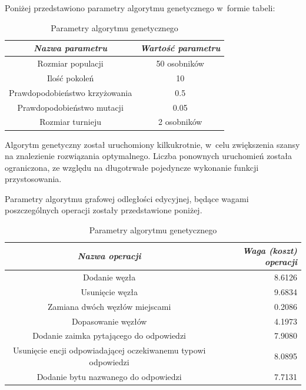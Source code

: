 \documentclass[a4paper, twoside, openright, 12pt]{report}
\begin{document}
        Poniżej przedstawiono parametry algorytmu genetycznego w~formie tabeli:
            \begin{table}[h]
                \centering
                \begin{tabular}{ | c | c | }
                  \hline
                  \emph{Nazwa parametru} & \emph{Wartość parametru} \\ \hline
                  Rozmiar populacji & 50 osobników \\ \hline
                  Ilość pokoleń & 10 \\ \hline
                  Prawdopodobieństwo krzyżowania & 0.5 \\ \hline
                  Prawdopodobieństwo mutacji & 0.05 \\ \hline
                  Rozmiar turnieju & 2 osobników \\ \hline
                \end{tabular}
                \caption{Parametry algorytmu genetycznego}
                \label{TAB:GEN_PARAMS}
            \end{table}

        Algorytm genetyczny został uruchomiony kilkukrotnie, w~celu zwiększenia szansy na znalezienie rozwiązania
        optymalnego. Liczba ponownych uruchomień została ograniczona, ze względu na długotrwałe pojedyncze wykonanie
        funkcji przystosowania.

        Parametry algorytmu grafowej odległości edycyjnej, będące wagami poszczególnych operacji zostały przedstawione
        poniżej.

            \begin{table}[h]
                \centering
                \begin{tabular}{ | c | r | }
                  \hline
                  \emph{Nazwa operacji} & \emph{Waga (koszt) operacji} \\ \hline
                  Dodanie węzła & 8.6126\\ \hline
                  Usunięcie węzła & 9.6834 \\ \hline
                  Zamiana dwóch węzłów miejscami & 0.2086 \\ \hline
                  Dopasowanie węzłów & 4.1973 \\ \hline
                  Dodanie zaimka pytającego do odpowiedzi & 7.9080 \\ \hline
                  Usunięcie encji odpowiadającej oczekiwanemu typowi odpowiedzi & 8.0895 \\ \hline
                  Dodanie bytu nazwanego do odpowiedzi & 7.7131 \\ \hline
                \end{tabular}
                \caption{Parametry algorytmu genetycznego}
                \label{TAB:WEIGHTS}
            \end{table}
\end{document}
